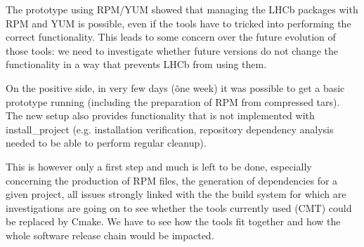\documentclass{lhcbnote}
\begin{document}
The prototype using RPM/YUM showed that managing the LHCb packages with RPM and YUM is possible, even if the tools have to tricked into performing the correct functionality. This leads to some concern over the future evolution of those tools: we need to investigate whether future versions do not change the functionality in a way that prevents LHCb from using them.

On the positive side, in very few days (\~ one week) it was possible to get a basic prototype running (including the preparation of RPM from compressed tars). The new setup also provides functionality that is not implemented with install\_project (e.g. installation verification, repository dependency analysis needed to be able to perform regular cleanup).

This is however only a first step and much is left to be done, especially concerning the production of RPM files, the generation of dependencies for a given project, all issues strongly linked with the the build system for which are investigations are going on to see whether the tools currently used (CMT) could be replaced by Cmake. We have to see how the tools fit together and how the whole software release chain would be impacted.
\end{document}
